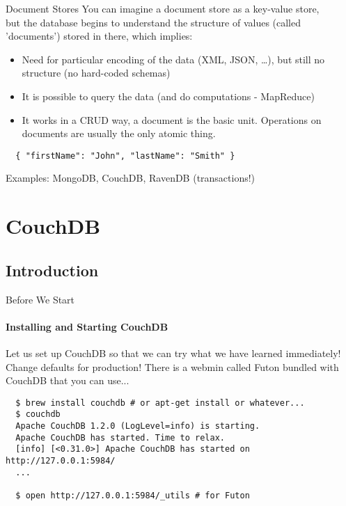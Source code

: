 \documentclass{beamer}
\begin{document}
\begin{frame}[fragile]{Document Stores}
  You can imagine a document store as a key-value store,\\but the database begins
  to understand the structure of values (called 'documents') stored in there,
  which implies:
  \begin{itemize}
    \item Need for particular encoding of the data (XML, JSON, \ldots),
          but still no structure (no hard-coded schemas)
    \item It is possible to query the data (and do computations - MapReduce)
    \item It works in a CRUD way, a document is the basic unit.
          Operations on documents are usually the only atomic thing.
  \end{itemize}
  \fontsize{8}{10}\selectfont
  \begin{verbatim}
  { "firstName": "John", "lastName": "Smith" }
  \end{verbatim}
  Examples: MongoDB, \alert<2>{CouchDB}, RavenDB (transactions!)
\end{frame}

\section{CouchDB}
\subsection{Introduction}
\begin{frame}[fragile]{Before We Start}
  \framesubtitle{Installing and Starting CouchDB}
  Let us set up CouchDB so that we can try what we have learned immediately!
  Change defaults for production! There is a webmin called Futon
  bundled with CouchDB that you can use...
  \fontsize{6}{8}\selectfont
  \begin{verbatim}
  $ brew install couchdb # or apt-get install or whatever...
  $ couchdb
  Apache CouchDB 1.2.0 (LogLevel=info) is starting.
  Apache CouchDB has started. Time to relax.
  [info] [<0.31.0>] Apache CouchDB has started on http://127.0.0.1:5984/
  ...

  $ open http://127.0.0.1:5984/_utils # for Futon
  \end{verbatim}
\end{frame}
\end{document}
